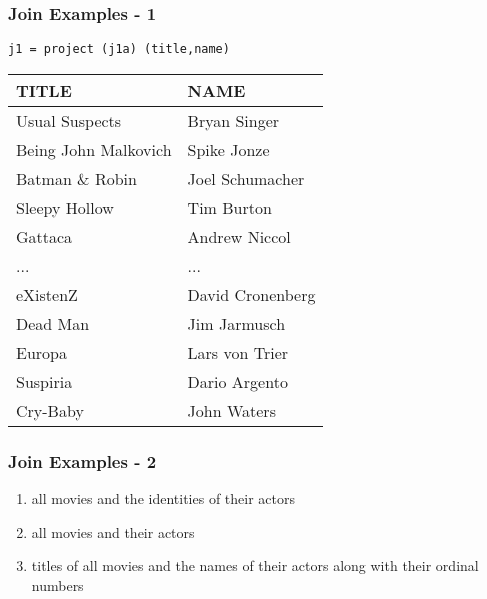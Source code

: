 \documentclass[dvipsnames]{beamer}
\theoremstyle{plain}
\begin{document}
\begin{frame}[fragile]
  \frametitle{Join Examples - 1}

  \begin{example}
    \begin{lstlisting}
j1 = project (j1a) (title,name)
    \end{lstlisting}

    \pause
    \begin{tiny}
    \begin{table}
      \begin{tabular}{|l|l|}\hline
TITLE                & NAME            \\\hline\hline
Usual Suspects       & Bryan Singer    \\\hline
Being John Malkovich & Spike Jonze     \\\hline
Batman \& Robin      & Joel Schumacher \\\hline
Sleepy Hollow        & Tim Burton      \\\hline
Gattaca              & Andrew Niccol   \\\hline
...                  & ...             \\\hline
eXistenZ             & David Cronenberg\\\hline
Dead Man             & Jim Jarmusch    \\\hline
Europa               & Lars von Trier  \\\hline
Suspiria             & Dario Argento   \\\hline
Cry-Baby             & John Waters     \\\hline
      \end{tabular}
    \end{table}
    \end{tiny}
  \end{example}
\end{frame}

\begin{frame}
  \frametitle{Join Examples - 2}

  \begin{example}
    \pause
    \begin{enumerate}
      \item all movies and the identities of their actors

      \pause
      \item all movies and their actors

      \pause
      \item titles of all movies and the names of their actors along with their
        ordinal numbers
    \end{enumerate}
  \end{example}
\end{frame}
\end{document}
